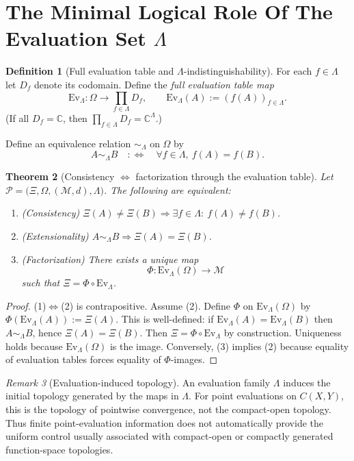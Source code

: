 \documentclass{lmcs} %
\theoremstyle{plain}
\theoremstyle{plain}
\newtheorem{theorem}{Theorem}[section]
\theoremstyle{definition}
\newtheorem{definition}[theorem]{Definition}
\theoremstyle{remark}
\newtheorem{remark}[theorem]{Remark}
\theoremstyle{definition}
\theoremstyle{remark}
\numberwithin{equation}{section}
\begin{document}
\section{The Minimal Logical Role Of The Evaluation Set \texorpdfstring{$\Lambda$}{Lambda}}{\label{sec:MinLogRoleEv}}

\begin{definition}[Full evaluation table and $\Lambda$-indistinguishability]
For each $f\in\Lambda$ let $D_f$ denote its codomain. Define the \textit{full evaluation table map}
\[
  \mathrm{Ev}_\Lambda:\Omega \to \prod_{f\in\Lambda} D_f,
  \qquad
  \mathrm{Ev}_\Lambda(A) := (f(A))_{f\in\Lambda}.
\]
(If all $D_f=\mathbb{C}$, then $\prod_{f\in\Lambda}D_f = \mathbb{C}^\Lambda$.)

Define an equivalence relation $\sim_\Lambda$ on $\Omega$ by
\[
  A\sim_\Lambda B \quad:\Longleftrightarrow\quad \forall f\in\Lambda,\ f(A)=f(B).
\]
\end{definition}

\begin{theorem}[Consistency $\Leftrightarrow$ factorization through the evaluation table]\label{th:consEvTable}
Let $\mathcal{P}=\bigl( \Xi,\Omega,(\mathcal{M},d),\Lambda \bigr)$.
The following are equivalent:
\begin{enumerate}
  \item (Consistency) $\Xi(A)\neq\Xi(B)\Rightarrow \exists f\in\Lambda:\ f(A)\neq f(B)$.
  \item (Extensionality) $A\sim_\Lambda B \Rightarrow \Xi(A)=\Xi(B)$.
  \item (Factorization) There exists a unique map
    \[
      \Phi:\mathrm{Ev}_\Lambda(\Omega)\to \mathcal{M}
    \]
    such that $\Xi=\Phi\circ \mathrm{Ev}_\Lambda$.
\end{enumerate}
\end{theorem}

\begin{proof}
(1)$\Leftrightarrow$(2) is contrapositive.
Assume (2). Define $\Phi$ on $\mathrm{Ev}_\Lambda(\Omega)$ by
$\Phi(\mathrm{Ev}_\Lambda(A)):=\Xi(A)$.
This is well-defined: if $\mathrm{Ev}_\Lambda(A)=\mathrm{Ev}_\Lambda(B)$ then $A\sim_\Lambda B$, hence $\Xi(A)=\Xi(B)$.
Then $\Xi=\Phi\circ \mathrm{Ev}_\Lambda$ by construction.
Uniqueness holds because $\mathrm{Ev}_\Lambda(\Omega)$ is the image.
Conversely, (3) implies (2) because equality of evaluation tables forces equality of $\Phi$-images.
\end{proof}

\begin{remark}[Evaluation-induced topology]
An evaluation family \(\Lambda\) induces the initial topology generated by the maps in
\(\Lambda\). For point evaluations on \(C(X,Y)\), this is the topology of pointwise
convergence, not the compact-open topology. Thus finite point-evaluation information
does not automatically provide the uniform control usually associated with compact-open
or compactly generated function-space topologies.
\end{remark}
\end{document}
